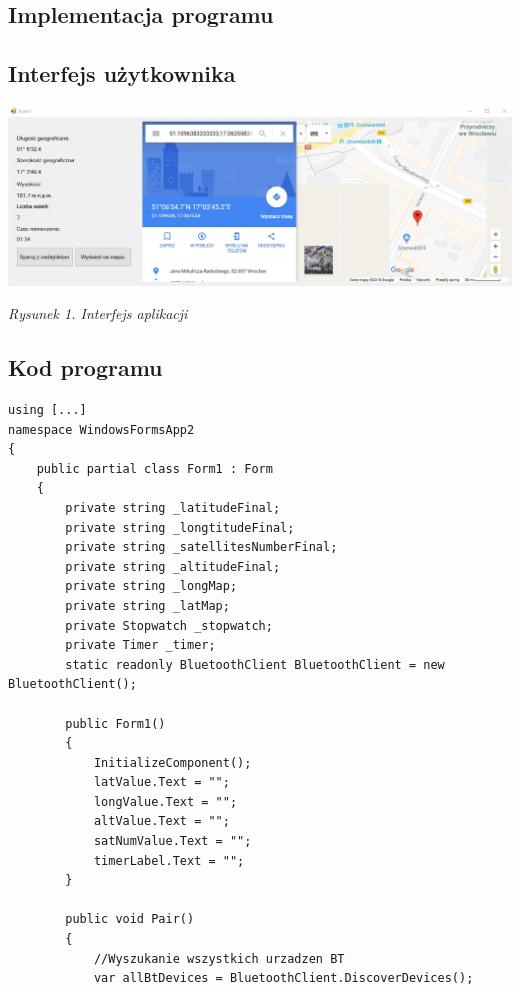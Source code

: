 \documentclass[12pt,a4paper,notitlepage]{report}
\begin{document}
\begin{adjustwidth}{0pt}{-50pt}
\section{Implementacja programu}
\subsection{Interfejs użytkownika}
\noindent \includegraphics[scale=0.45]{okno}
\begin{center}
\footnotesize \textit{Rysunek 1. Interfejs aplikacji}
\end{center}
\subsection{Kod programu}
\begin{lstlisting}
using [...]
namespace WindowsFormsApp2
{
    public partial class Form1 : Form
    {
        private string _latitudeFinal;
        private string _longtitudeFinal;
        private string _satellitesNumberFinal;
        private string _altitudeFinal;
        private string _longMap;
        private string _latMap;
        private Stopwatch _stopwatch;
        private Timer _timer;
        static readonly BluetoothClient BluetoothClient = new BluetoothClient();

        public Form1()
        {
            InitializeComponent();
            latValue.Text = "";
            longValue.Text = "";
            altValue.Text = "";
            satNumValue.Text = "";
            timerLabel.Text = "";
        }
        
        public void Pair()
        {
            //Wyszukanie wszystkich urzadzen BT
            var allBtDevices = BluetoothClient.DiscoverDevices();
   

\end{lstlisting}
\end{adjustwidth}
\end{document}
